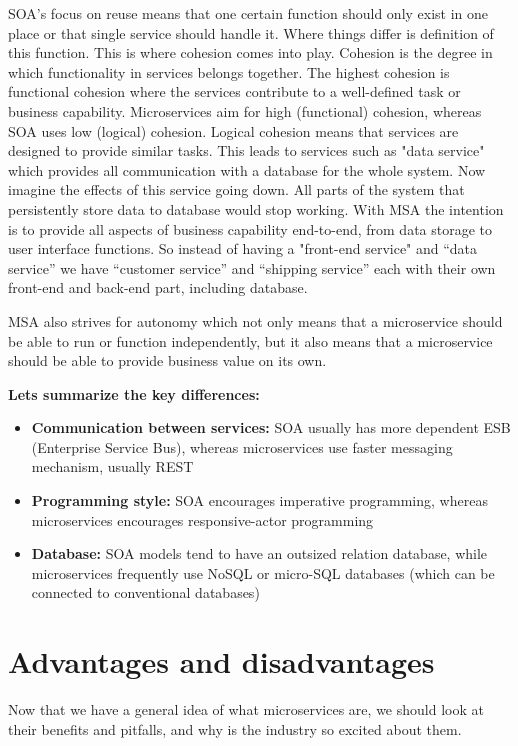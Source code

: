 \documentclass[12pt,oneside]{fithesis2}
\begin{document}
SOA's focus on reuse means that one certain function should only exist in one place or that single service should handle it. Where things differ is definition of this function. This is where cohesion comes into play. Cohesion is the degree in which functionality in services belongs together. The highest cohesion is functional cohesion where the services contribute to a well-defined task or business capability. Microservices aim for high (functional) cohesion, whereas SOA uses low (logical) cohesion. Logical cohesion means that services are designed to provide similar tasks. This leads to services such as "data service"  which provides all communication with a database for the whole system. Now imagine the effects of this service going down. All parts of the system that persistently store data to database would stop working. With MSA the intention is to provide all aspects of business capability end-to-end, from data storage to user interface functions. So instead of having a "front-end service" and “data service” we have “customer service” and “shipping service” each with their own front-end and back-end part, including database.

MSA also strives for autonomy which not only means that a microservice should be able to run or function independently, but it also means that a microservice should be able to provide business value on its own.
\bigskip

\noindent\textbf{Lets summarize the key differences:}

\begin{itemize}
\item \textbf{Communication between services:} SOA usually has more dependent ESB (Enterprise Service Bus), whereas microservices use faster messaging mechanism, usually REST
\item \textbf{Programming style:} SOA encourages imperative programming, whereas microservices encourages responsive-actor programming
\item \textbf{Database:} SOA models tend to have an outsized relation database, while microservices frequently use NoSQL or micro-SQL databases (which can be connected to conventional databases)
\end{itemize}


\section{Advantages and disadvantages}

Now that we have a general idea of what microservices are, we should look at their benefits and pitfalls, and why is the industry so excited about them.
\end{document}
